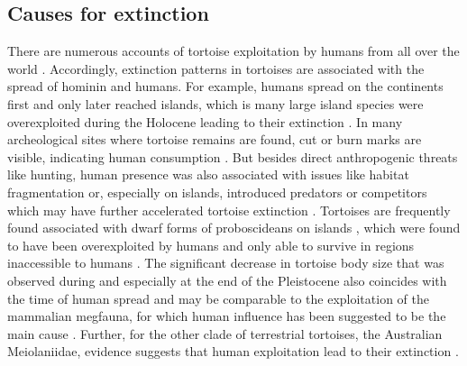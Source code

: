 
%

\subsection{Causes for extinction}
There are numerous accounts of tortoise exploitation by humans from all over the world \citep{Blasco2008,Blasco2011,Blasco2016,Pritchard2013,Speth2002,Thompson2014,Steadman2017,Franz2001,Avery2004,Karl2012,Archer2014,Mudar2007,Munro2010,Peres2006,Sampson1998,Sampson2000}. Accordingly, extinction patterns in tortoises are associated with the spread of hominin and humans. For example, humans spread on the continents first and only later reached islands, which is many large island species were overexploited during the Holocene leading to their extinction \citep{Rhodin2015}. 
In many archeological sites where tortoise remains are found, cut or burn marks are visible, indicating human consumption \citep{Archer2014,Biton2017,Blasco2008,Blasco2016,Munro2010}. But besides direct anthropogenic threats like hunting, human presence was also associated with issues like habitat fragmentation or, especially on islands, introduced predators or competitors which may have further accelerated tortoise extinction \citep{Sterli2015}. 
Tortoises are frequently found associated with dwarf forms of proboscideans on islands \citep{Hooijer1951,Vlachos2014}, which were found to have been overexploited by humans and only able to survive in regions inaccessible to humans \citep{Surovell2005}.
The significant decrease in tortoise body size that was observed during and especially at the end of the Pleistocene also coincides with the time of human spread and may be comparable to the exploitation of the mammalian megfauna, for which human influence has been suggested to be the main cause \citep{Barnosky2004, Sandom2014}.
Further, for the other clade of terrestrial tortoises, the Australian Meiolaniidae, evidence suggests that human exploitation lead to their extinction \citep{White2010}.
